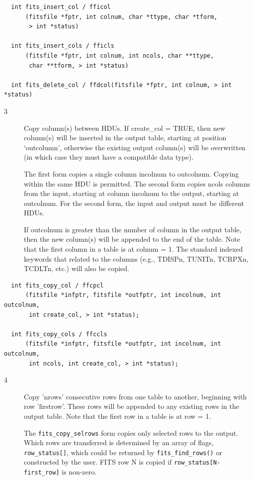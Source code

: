 \documentclass[11pt]{book}
\begin{document}
\begin{verbatim}
  int fits_insert_col / fficol
      (fitsfile *fptr, int colnum, char *ttype, char *tform,
       > int *status)

  int fits_insert_cols / fficls
      (fitsfile *fptr, int colnum, int ncols, char **ttype,
       char **tform, > int *status)

  int fits_delete_col / ffdcol(fitsfile *fptr, int colnum, > int *status)
\end{verbatim}

\begin{description}
\item[3 ] Copy column(s) between HDUs.  If create\_col = TRUE, then
    new column(s) will be inserted in the output table, starting at
    position `outcolumn', otherwise the existing output column(s) will
    be overwritten (in which case they must have a compatible data
    type).

    The first form copies a single column incolnum to outcolnum.
    Copying within the same HDU is permitted.  The second form copies
    ncols columns from the input, starting at column incolnum to the
    output, starting at outcolnum.  For the second form, the input and
    output must be different HDUs.

    If outcolnum is greater than the number of column in the output table, then
    the new column(s) will be appended to the end of the table.
    Note that the first column in a table is at colnum = 1.
    The standard indexed keywords that related to the columns (e.g., TDISPn,
    TUNITn, TCRPXn, TCDLTn, etc.) will also be copied. \label{ffcpcl} \label{ffccls}
\end{description}

\begin{verbatim}
  int fits_copy_col / ffcpcl
      (fitsfile *infptr, fitsfile *outfptr, int incolnum, int outcolnum,
       int create_col, > int *status);

  int fits_copy_cols / ffccls
      (fitsfile *infptr, fitsfile *outfptr, int incolnum, int outcolnum, 
       int ncols, int create_col, > int *status);
\end{verbatim}

\begin{description}
\item[4 ] Copy 'nrows' consecutive rows from one table to another, beginning
    with row 'firstrow'.  These rows will be appended to any existing
    rows in the output table.
   Note that the first row in a table is at row = 1. 

   The \verb|fits_copy_selrows| form copies only selected rows to the output.
   Which rows are transferred is determined by an array of flags, \verb|row_status[]|,
   which could be returned by \verb|fits_find_rows()| or constructed by the user.
   FITS row N is copied if \verb|row_status[N-first_row]| is non-zero.  
   \label{ffcprw} \label{ffcpsr}
\end{description}
\end{document}

